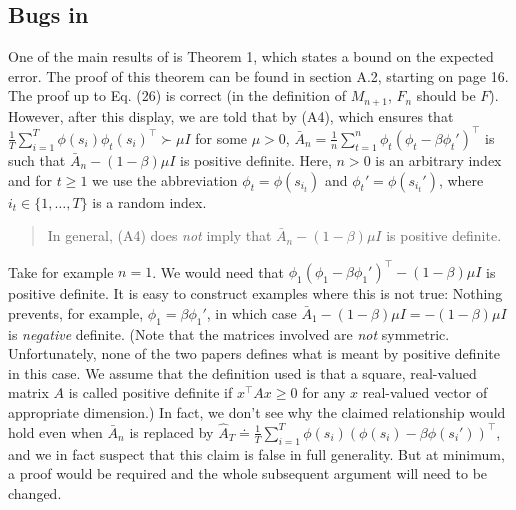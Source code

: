\documentclass{article}
\begin{document}
\subsection{Bugs in \cite{flstda}}
One of the main results of \citet{flstda} is Theorem 1, which states a bound on the expected error.
The proof of this theorem can be found in section A.2, starting on page 16.
The proof up to Eq. (26) is correct (in the definition of $M_{n+1}$, $F_n$ should be $F$).
However, after this display, we are told that by (A4), which ensures that $\frac1T \sum_{i=1}^T \phi(s_i) \phi_t(s_i)^\top \succ \mu I$ for some $\mu>0$, $\bar A_n = \frac1n \sum_{t=1}^n \phi_t (\phi_t - \beta \phi_t')^\top$ is such that $\bar A_n - (1-\beta) \mu I $ is positive definite. 
Here, $n>0$ is an arbitrary index and for $t\ge 1$ we use the abbreviation $\phi_t = \phi(s_{i_t})$ and $\phi_t' = \phi(s_{i_t}')$, where $i_t\in \{1,\dots,T\}$ is a random index.
\begin{quote}
In general, (A4) does \emph{not} imply that  $\bar A_n - (1-\beta) \mu I $ is positive definite.
\end{quote}
Take for example $n=1$. We would need that $\phi_1 (\phi_1 - \beta \phi_1')^\top - (1-\beta) \mu I$ is positive definite.
It is easy to construct examples where this is not true: Nothing prevents, for example, $\phi_1 = \beta \phi_1'$, in which case $\bar A_1 - (1-\beta)\mu I = -(1-\beta)\mu I$ is \emph{negative} definite.
(Note that the matrices involved are \emph{not} symmetric. Unfortunately, none of the two papers defines what is meant by positive definite in this case. We assume that the definition used is that a square, real-valued matrix $A$ is called positive definite if $x^\top A x\ge 0$ for any $x$ real-valued vector of appropriate dimension.)
In fact, we don't see why the claimed relationship would hold even when 
$\bar A_n$ is replaced by $\hat A_T \doteq  \frac1T \sum_{i=1}^T \phi( s_i) (\phi(s_i) - \beta \phi(s_i'))^\top$,
and we in fact suspect that this claim is false in full generality. But at minimum, a proof would be required and the whole subsequent argument will need to be changed.
\end{document}
